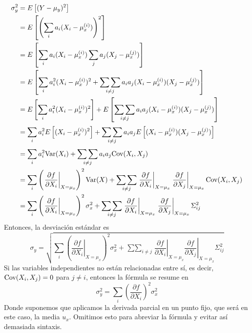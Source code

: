\documentclass[a4paper, 10pt]{article}
\begin{document}
\begin{equation}
    \begin{split}
        \sigma_y^{2} &= E\left[(Y-\mu_y)^{2}\right] \\
        &=E\left[\left(\sum_{i}^{}{a_i(X_i-\mu_x^{(i)})}\right)^{2}\right] \\
        &=E\left[\sum_{i}^{}{a_i(X_i-\mu_x^{(i)})} \sum_{j}^{}{a_j(X_j-\mu_x^{(j)})}\right] \\
        &=E\left[\sum_{i}^{}{a_i^{2}(X_i-\mu_x^{(i)})^{2}}+\mathop{\sum\sum}_{i\neq j}{a_i a_j (X_i-\mu_x^{(i)})(X_j-\mu_x^{(j)})}\right] \\
        &=E\left[\sum_{i}^{}{a_i^{2}(X_i-\mu_x^{(i)})^{2}}\right]+E\left[\mathop{\sum\sum}_{i\neq j}{a_i a_j (X_i-\mu_x^{(i)})(X_j-\mu_x^{(j)})}\right] \\
        &=\sum_{i}^{}a_i^{2}E\left[{(X_i-\mu_x^{(i)})^{2}}\right]+\mathop{\sum\sum}_{i\neq j}a_i a_jE\left[{ (X_i-\mu_x^{(i)})(X_j-\mu_x^{(j)})}\right] \\
        &=\sum_{i}^{}a_i^{2}\textnormal{Var}(X_i)+\mathop{\sum\sum}_{i\neq j} a_i a_j\textnormal{Cov}(X_i, X_j) \\
        &=\sum_{i}^{}\left(\left.\dfrac{\partial f}{\partial X_i}\right\rvert_{X=\mu_x}\right)^{2}\textnormal{Var}(X)+\mathop{\sum\sum}_{i\neq j} \left.\dfrac{\partial f}{\partial X_i}\right\rvert_{X=\mu_x} \left.\dfrac{\partial f}{\partial X_j}\right\rvert_{X=\mu_x}\textnormal{Cov}(X_i, X_j) \\
        &=\sum_{i}^{}\left(\left.\dfrac{\partial f}{\partial X_i}\right\rvert_{X=\mu_x}\right)^{2}\sigma^{2}_x+\mathop{\sum\sum}_{i\neq j} \left.\dfrac{\partial f}{\partial X_i}\right\rvert_{X=\mu_x} \left.\dfrac{\partial f}{\partial X_j}\right\rvert_{X=\mu_x}\Sigma^{2}_{ij} \\
    \end{split}
\end{equation}
Entonces, la desviación estándar es
\begin{equation}
    \sigma_y=\sqrt{\sum_{i}^{}\left(\left.\dfrac{\partial f}{\partial X_i}\right\rvert_{X=\mu_x}\right)^{2}\sigma^{2}_x+\mathop{\sum\sum}_{i\neq j} \left.\dfrac{\partial f}{\partial X_i}\right\rvert_{X=\mu_x} \left.\dfrac{\partial f}{\partial X_j}\right\rvert_{X=\mu_x}\Sigma^{2}_{ij}}
\end{equation}
Si las variables independientes no están relacionadas entre sí, es decir, $\textnormal{Cov}(X_i, X_j) = 0$ para $j\neq i$,
entonces la fórmula se resume en
\begin{equation}
    \sigma_y^{2} = \sum_{i}^{}\left(\dfrac{\partial f}{\partial X_i}\right)^{2}\sigma^{2}_x
\end{equation}
Donde suponemos que aplicamos la derivada parcial en un punto fijo, que será en este caso, la media $u_x$.
Omitimos esto para abreviar la fórmula y evitar así demasiada sintaxis.
\end{document}
